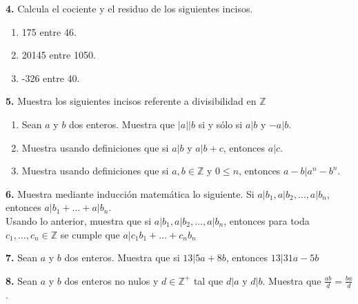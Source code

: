\documentclass[12pt]{article}
\begin{document}
%
%
\textbf{4.} Calcula el cociente y el residuo de los siguientes incisos.

    \begin{enumerate}[label=\alph*)]

        \item 175 entre 46.

        \item 20145 entre 1050.

        \item -326 entre 40.

    \end{enumerate}
\vspace{1cm}

%
%
\textbf{5.} Muestra los siguientes incisos referente a divisibilidad en $\mathbb{Z}$

    \begin{enumerate}[label=\alph*)]
        \item Sean $a$ y $b$ dos enteros. Muestra que $|a| | b$ si y sólo si $a | b$ y $-a |b$.

        \item Muestra usando definiciones que si $a | b$ y $a | b + c$, entonces $a | c$.

        \item Muestra usando definiciones que si $a , b \in \mathbb{Z}$ y $0 \leq n$, entonces $a - b | a^n - b^n$.
           \end{enumerate}

\vspace{1cm}

%
%
\textbf{6.} Muestra mediante inducción matemática lo siguiente. Si $a | b_1, a | b_2, \dots, a | b_n$, entonces $a | b_1 + \dots + a | b_n$.\\

Usando lo anterior, muestra que si $a | b_1, a | b_2, \dots, a | b_n$, entonces para toda $c_1, \dots, c_n \in \mathbb{Z}$ se cumple que $a | c_1b_1 + \dots + c_nb_n$
\vspace{1cm}

%
%
\textbf{7.} Sean $a$ y $b$ dos enteros. Muestra que si $13 | 5a + 8b$, entonces $13|31a - 5b$\\

\vspace{1cm}

%
%
\textbf{8.} Sean $a$ y $b$ dos enteros no nulos y $d \in \mathbb{Z}^+$ tal que $d | a$ y $d | b$. Muestra que $\frac{ab}{d} = \frac{ba}{d}$.
\end{document}
